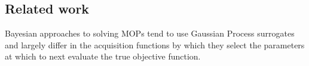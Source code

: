 \documentclass[conference]{IEEEtran}
\newcommand{\parameterspace}{\Omega}
\newcommand{\nobj}{M}
\DeclareMathOperator*{\argmax}{\arg\!\max}
\newcommand\ei{EI\xspace}
\newcommand{\bx}{\mathbf{x}}
\newcommand{\bff}{\mathbf{f}}
\begin{document}


\subsection{Related work}\label{section:related_work}
Bayesian approaches to solving MOPs tend to use Gaussian Process surrogates and largely differ in the acquisition functions by which they select the parameters at which to next evaluate the true objective function.
\end{document}
